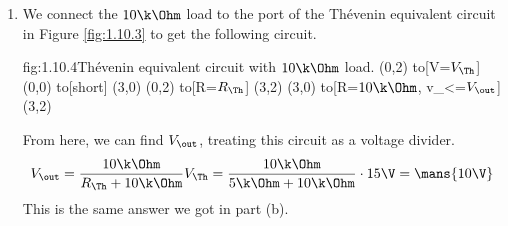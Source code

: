 \documentclass{article}
\begin{document}
\begin{enumerate}
        We can find $V_{\Th}$ by leaving the ports open (open circuit) and measuring $V_\out$, the voltage across $R_2$. This comes out to be half the input voltage when $R_1 = R_2$, so $V_\out = 15\V$. Thus $V_{\Th} = \mans{15\V}$.
        
        To find the Th\'evinen resistance, we need to find the short circuit current, $I_{SC}$. We short circuit the port and measure the current flowing through it.
        \begin{circuit}{fig:1.10.2}{Voltage divider with short circuit on the output.}
            (0,2) to[V=$V_{\in}$] (0,0) 
            to[short] (2,0)
            to[R=$R_2$] (2,2)
            to[R=$R_1$](0,2)
            (2,0) to[short] (3,0)
            (2,2) to[short] (3,2)
            (3,0) to[short, i_<=$I_{SC}$] (3,2) 
        \end{circuit}
        
        In this circuit, no current flows through $R_2$, flowing through the short instead. Thus we have $I_{SC} = \dfrac{V_\in }{R_1}$. From this, we can find $R_\Th$ from $R_\Th = \dfrac{V_\Th}{I_{SC}}$. This gives us 
        \[R_\Th = \frac{V_\Th}{I_{SC}} = \frac{V_\Th}{V_\in/R_1} = \frac{15\V}{30\V/10\k\Ohm} = \mans{5\k\Ohm}\]

        The Th\'evenin equivalent circuit takes the form shown below.
        \begin{circuit}{fig:1.10.3}{Th\'evenin equivalent circuit.}
            (0,2) to[V=$V_{\Th}$] (0,0)
            to[short, -o] (3,0)
            (0,2) to[R=$R_{\Th}$, -o] (3,2)
            (3,0) to[open, v_<=$V_\out$] (3,2)
        \end{circuit}
        In terms of behavior at the ports, this circuit is equivalent to the circuit in Figure \ref{fig:1.10.1}. 

        \item 
        We connect the $10\k\Ohm$ load to the port of the Th\'evenin equivalent circuit in Figure \ref{fig:1.10.3} to get the following circuit.
        \begin{circuit}{fig:1.10.4}{Th\'evenin equivalent circuit with $10\k\Ohm$ load.}
            (0,2) to[V=$V_{\Th}$] (0,0)
            to[short] (3,0)
            (0,2) to[R=$R_{\Th}$] (3,2)
            (3,0) to[R=$10\k\Ohm$, v_<=$V_\out$] (3,2)
        \end{circuit}
        From here, we can find $V_\out$, treating this circuit as a voltage divider.
        \[V_\out = \frac{10\k\Ohm}{R_\Th + 10\k\Ohm} V_\Th = \frac{10\k\Ohm}{5\k\Ohm + 10\k\Ohm} \cdot 15\V = \mans{10\V}\] 
        This is the same answer we got in part (b).


\end{enumerate}
\end{document}
